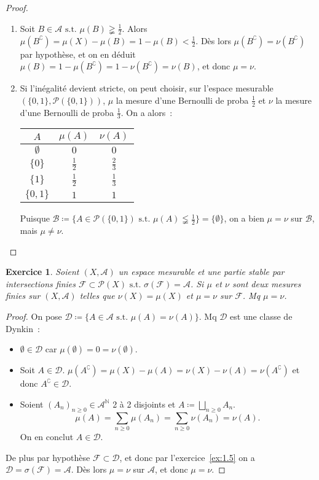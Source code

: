 \documentclass{article}
\newtheorem{ex}{Exercice}[section]
\theoremstyle{definition}
\newcommand{\st}{\text{ s.t. }}
\newcommand{\C}{\complement}
\newcommand{\N}{{\mathbb N}}
\begin{document}
\begin{proof}~
\begin{enumerate}
	\item Soit $B \in \mathcal A \st \mu(B) \gneqq \frac 12$. Alors $\mu(B^\C) = \mu(X) - \mu(B) = 1 - \mu(B) < \frac 12$. Dès lors $\mu(B^\C) = \nu(B^\C)$ par hypothèse,
	et on en déduit $\mu(B) = 1 - \mu(B^\C) = 1 - \nu(B^\C) = \nu(B)$, et donc $\mu = \nu$.
	\item Si l'inégalité devient stricte, on peut choisir, sur l'espace mesurable $(\{0, 1\}, \mathcal P(\{0, 1\}))$, $\mu$ la mesure d'une Bernoulli de proba
	$\frac 12$ et $\nu$ la mesure d'une Bernoulli de proba $\frac 13$. On a alors~:

	\begin{tabular}{c|c|c}
		$A$ & $\mu(A)$ & $\nu(A)$ \\
		\hline
		$\emptyset$ & $0$ & $0$ \\
		$\{0\}$ & $\frac 12$ & $\frac 23$ \\
		$\{1\}$ & $\frac 12$ & $\frac 13$ \\
		$\{0, 1\}$ & $1$ & $1$
	\end{tabular}

	Puisque $\mathcal B \coloneqq \{A \in \mathcal P(\{0, 1\}) \st \mu(A) \lneqq \frac 12\} = \{\emptyset\}$, on a bien $\mu = \nu$ sur $\mathcal B$, mais $\mu \neq \nu$.
\end{enumerate}
\end{proof}

\begin{ex} Soient $(X, \mathcal A)$ un espace mesurable et une partie stable par intersections finies $\mathcal F \subset \mathcal P(X) \st \sigma(\mathcal F) = \mathcal A$.
Si $\mu$ et $\nu$ sont deux mesures finies sur $(X, \mathcal A)$ telles que $\nu(X) = \mu(X)$ et $\mu = \nu$ sur $\mathcal F$. Mq $\mu = \nu$.
\end{ex}

\begin{proof} On pose $\mathcal D \coloneqq \{A \in \mathcal A \st \mu(A) = \nu(A)\}$. Mq $\mathcal D$ est une classe de Dynkin~:
\begin{itemize}
	\item $\emptyset \in \mathcal D$ car $\mu(\emptyset) = 0 = \nu(\emptyset)$.
	\item Soit $A \in \mathcal D$. $\mu(A^\C) = \mu(X) - \mu(A) = \nu(X) - \nu(A) = \nu(A^\C)$ et donc $A^\C \in \mathcal D$.
	\item Soient $(A_n)_{n \geq 0} \in {\mathcal A}^\N$ 2 à 2 disjoints et $A \coloneqq \bigsqcup_{n \geq 0}A_n$.
	\[\mu(A) = \sum_{n \geq 0}\mu(A_n) = \sum_{n \geq 0}\nu(A_n) = \nu(A).\]
	On en conclut $A \in \mathcal D$.
\end{itemize}

De plus par hypothèse $\mathcal F \subset \mathcal D$, et donc par l'exercice~\ref{ex:1.5} on a $\mathcal D = \sigma(\mathcal F) = \mathcal A$. Dès lors $\mu = \nu$ sur $\mathcal A$,
et donc $\mu = \nu$.
\end{proof}
\end{document}
